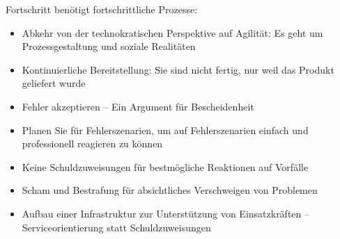 
\begin{frame}[light]{}
  Fortschritt benötigt fortschrittliche Prozesse:
\end{frame}


\begin{frame}[light]{}
\begin{itemize}
  \item Abkehr von der technokratischen Perspektive auf Agilität: Es geht um Prozessgestaltung und soziale Realitäten
  \item Kontinuierliche Bereitstellung: Sie sind nicht fertig, nur weil das Produkt geliefert wurde
  \item Fehler akzeptieren – Ein Argument für Bescheidenheit 
  \item     Planen Sie für Fehlerszenarien, um auf Fehlerszenarien einfach und professionell reagieren zu können
  \item     Keine Schuldzuweisungen für bestmögliche Reaktionen auf Vorfälle
  \item     Scham und Bestrafung für absichtliches Verschweigen von Problemen
  \item     Aufbau einer Infrastruktur zur Unterstützung von Einsatzkräften – Serviceorientierung statt Schuldzuweisungen
\end{itemize}
\end{frame}
